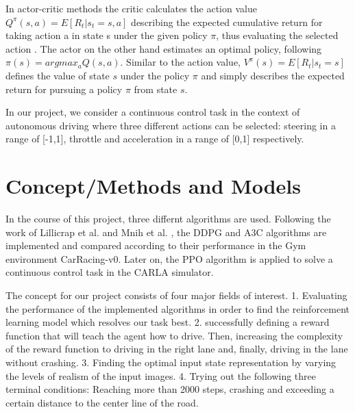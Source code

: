 \documentclass[letterpaper, 10 pt, conference]{ieeeconf}  %
\begin{document}
In actor-critic methods the critic calculates the action value $Q^\pi(s,a) = E[R_t|s_t=s,a]$ describing the expected cumulative return for taking action a in state s under the given policy $\pi$, thus evaluating the selected action \cite{lilianweng}. The actor on the other hand estimates an optimal policy, following $\pi(s) = argmax_aQ(s,a)$. Similar to the action value, $V^\pi(s) = E[R_t|s_t=s]$ defines the value of state $s$ under the policy $\pi$ and simply describes the expected return for pursuing a policy $\pi$ from state $s$.

In our project, we consider a continuous control task in the context of autonomous driving where three different actions can be selected: steering in a range of [-1,1], throttle  and acceleration in a range of [0,1] respectively.

\section{Concept/Methods and Models}

In the course of this project, three differnt algorithms are used. Following the work of Lillicrap et al. \cite{lillicrapContinuousControlDeep2015} and Mnih et al. \cite{mnihAsynchronousMethodsDeep2016}, the DDPG and A3C algorithms are implemented and compared according to their performance in the Gym environment CarRacing-v0. Later on, the PPO algorithm is applied to solve a continuous control task in the CARLA simulator.

The concept for our project consists of four major fields of interest. 1. Evaluating the performance of the implemented algorithms in order to find the reinforcement learning model which resolves our task best. 2. successfully defining a reward function that will teach the agent how to drive. Then, increasing the complexity of the reward function to driving in the right lane and, finally, driving in the lane without crashing. 3. Finding the optimal input state representation by varying the levels of realism of the input images. 4. Trying out the following three terminal conditions: Reaching more than 2000 steps, crashing and exceeding a certain distance to the center line of the road.
\end{document}
